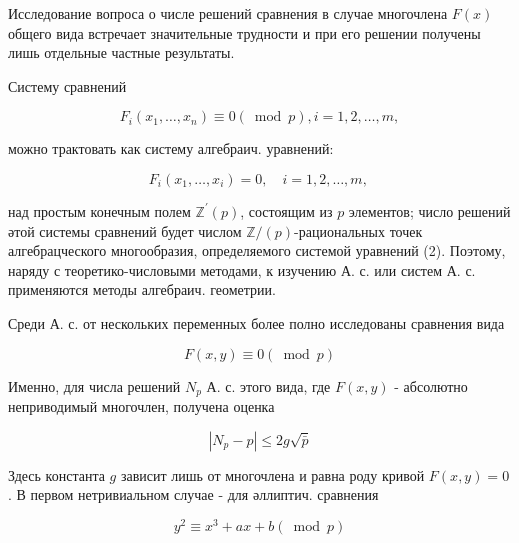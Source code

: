 \documentclass[10pt]{article}
\begin{document}
Исследование вопроса о числе решений сравнения в случае многочлена $F(x)$ общего вида встречает значительные трудности и при его решении получены лишь отдельные частные результаты.



Систему сравнений



\[

F_{i}\left(x_{1}, \ldots, x_{n}\right) \equiv 0(\bmod p), i=1,2, \ldots, m,

\]



можно трактовать как систему алгебраич. уравнений:



\[

F_{i}\left(x_{1}, \ldots, x_{i}\right)=0, \quad i=1,2, \ldots, m \text {, }

\]



над простым конечным полем $\mathbb{Z}^{\prime}(p)$, состоящим из $p$ элементов; число решений әтой системы сравнений будет числом $\mathbb{Z} /(p)$-рациональных точек алгебрацческого многообразия, определяемого системой уравнений (2). Поэтому, наряду с теоретико-числовыми методами, к изучению А. с. или систем А. с. применяются методы алгебраич. геометрии.



Среди А. с. от нескольких переменных более полно исследованы сравнения вида



\[

F(x, y) \equiv 0(\bmod p)

\]



Именно, для числа решений $N_{p}$ А. с. этого вида, где $F(x, y)$ - абсолютно неприводимый многочлен, получена оценка



\[

\left|N_{p}-p\right| \leqslant 2 g \sqrt{\bar{p}}

\]



Здесь константа $g$ зависит лишь от многочлена и равна роду кривой $F(x, y)=0$. В первом нетривиальном случае - для әллиптич. сравнения



\[

y^{2} \equiv x^{3}+a x+b(\bmod p)

\]
\end{document}
